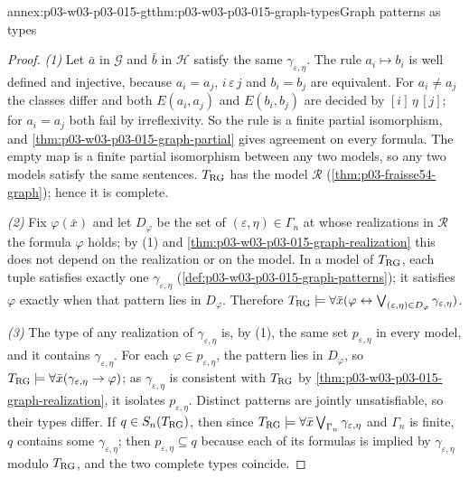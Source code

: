 \begin{annexitem}{annex:p03-w03-p03-015-gt}{thm:p03-w03-p03-015-graph-types}{Graph patterns as types}
\begin{proof}
\emph{(1)} Let \(\bar a\) in \(\mathcal G\) and \(\bar b\) in
\(\mathcal H\) satisfy the same \(\gamma_{\varepsilon,\eta}\). The rule
\(a_i\mapsto b_i\) is well defined and injective, because
\(a_i=a_j\), \(i\,\varepsilon\,j\) and \(b_i=b_j\) are equivalent. For
\(a_i\neq a_j\) the classes differ and both \(E(a_i,a_j)\) and
\(E(b_i,b_j)\) are decided by \([i]\,\eta\,[j]\); for \(a_i=a_j\) both
fail by irreflexivity. So the rule is a finite partial isomorphism, and
\cref{thm:p03-w03-p03-015-graph-partial} gives agreement on every formula.
The empty map is a finite partial isomorphism between any two models, so
any two models satisfy the same sentences. \(T_{\rm RG}\) has the model
\(\mathcal R\) (\cref{thm:p03-fraisse54-graph}); hence it is complete.

\emph{(2)} Fix \(\varphi(\bar x)\) and let \(D_\varphi\) be the set of
\((\varepsilon,\eta)\in\Gamma_n\) at whose realizations in \(\mathcal R\)
the formula \(\varphi\) holds; by (1) and
\cref{thm:p03-w03-p03-015-graph-realization} this does not depend on the
realization or on the model. In a model of \(T_{\rm RG}\), each tuple
satisfies exactly one \(\gamma_{\varepsilon,\eta}\)
(\cref{def:p03-w03-p03-015-graph-patterns}); it satisfies \(\varphi\)
exactly when that pattern lies in \(D_\varphi\). Therefore
\(T_{\rm RG}\models\forall\bar x(\varphi\leftrightarrow
\bigvee_{(\varepsilon,\eta)\in D_\varphi}\gamma_{\varepsilon,\eta})\).

\emph{(3)} The type of any realization of \(\gamma_{\varepsilon,\eta}\)
is, by (1), the same set \(p_{\varepsilon,\eta}\) in every model, and it
contains \(\gamma_{\varepsilon,\eta}\). For each
\(\varphi\in p_{\varepsilon,\eta}\), the pattern lies in \(D_\varphi\), so
\(T_{\rm RG}\models\forall\bar x(\gamma_{\varepsilon,\eta}\to\varphi)\);
as \(\gamma_{\varepsilon,\eta}\) is consistent with \(T_{\rm RG}\) by
\cref{thm:p03-w03-p03-015-graph-realization}, it isolates
\(p_{\varepsilon,\eta}\). Distinct patterns are jointly unsatisfiable, so
their types differ. If \(q\in S_n(T_{\rm RG})\), then since
\(T_{\rm RG}\models\forall\bar x\bigvee_{\Gamma_n}\gamma_{\varepsilon,\eta}\)
and \(\Gamma_n\) is finite, \(q\) contains some \(\gamma_{\varepsilon,\eta}\);
then \(p_{\varepsilon,\eta}\subseteq q\) because each of its formulas is
implied by \(\gamma_{\varepsilon,\eta}\) modulo \(T_{\rm RG}\), and the
two complete types coincide.


\end{proof}
\end{annexitem}
